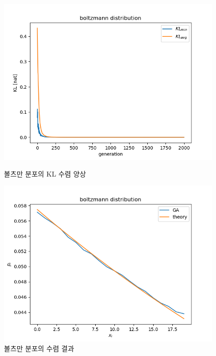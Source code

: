 \begin{figure}[!htb]
    \centering
    \begin{minipage}{.5\textwidth}
        \centering
        \includegraphics[width=\linewidth, height=0.63\linewidth]{images/boltzmann convergence KL.png}
        \caption{볼츠만 분포의 KL 수렴 양상}
        \label{fig:prob1_6_2}
    \end{minipage}%
    \begin{minipage}{0.5\textwidth}
        \centering
        \includegraphics[width=\linewidth, height=0.63\linewidth]{images/boltzmann result.png}
        \caption{볼츠만 분포의 수렴 결과}
        \label{fig:prob1_6_1}
    \end{minipage}
\end{figure}
